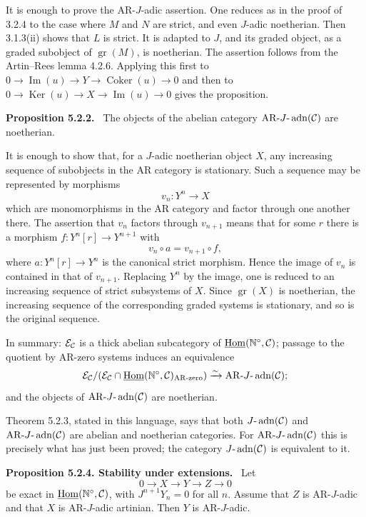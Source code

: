 \documentclass[11pt]{article}
\theoremstyle{plain}
\theoremstyle{definition}
\theoremstyle{remark}
\newenvironment{statement}[1]{\par\medskip\noindent\textbf{#1.}\ }{\par\medskip}
\newcommand{\bN}{\mathbb N}
\DeclareMathOperator{\Hom}{Hom}
\DeclareMathOperator{\Ker}{Ker}
\DeclareMathOperator{\Coker}{Coker}
\DeclareMathOperator{\Imn}{Im}
\DeclareMathOperator{\gr}{gr}
\newcommand{\AR}{\mathrm{AR}}
\providecommand{\adn}{\operatorname{adn}}
\begin{document}
It is enough to prove the AR-$J$-adic assertion. One reduces as in the proof of
3.2.4 to the case where $M$ and $N$ are strict, and even $J$-adic noetherian. Then
3.1.3(ii) shows that $L$ is strict. It is adapted to $J$, and its graded object, as
a graded subobject of $\gr(M)$, is noetherian. The assertion follows from the
Artin--Rees lemma 4.2.6. Applying this first to
$0\to\Imn(u)\to Y\to\Coker(u)\to0$ and then to
$0\to\Ker(u)\to X\to\Imn(u)\to0$ gives the proposition.

\begin{statement}{Proposition 5.2.2}
The objects of the abelian category $\AR\text{-}J\text{-}\adn(\cC)$ are noetherian.
\end{statement}

It is enough to show that, for a $J$-adic noetherian object $X$, any increasing
sequence of subobjects in the AR category is stationary. Such a sequence may be
represented by morphisms
\[
      v_n:Y^n\longrightarrow X
\]
which are monomorphisms in the AR category and factor through one another there.
The assertion that $v_n$ factors through $v_{n+1}$ means that for some $r$ there is
a morphism $f:Y^n[r]\to Y^{n+1}$ with
\[
      v_n\circ a=v_{n+1}\circ f,
\]
where $a:Y^n[r]\to Y^n$ is the canonical strict morphism. Hence the image of
$v_n$ is contained in that of $v_{n+1}$. Replacing $Y^n$ by the image, one is
reduced to an increasing sequence of strict subsystems of $X$. Since $\gr(X)$ is
noetherian, the increasing sequence of the corresponding graded systems is
stationary, and so is the original sequence.

In summary: $\mathcal E_\mathcal C$ is a thick abelian subcategory of
$\underline{\Hom}(\bN^\circ,\cC)$; passage to the quotient by AR-zero systems
induces an equivalence
\[
\cE_\cC/(\cE_\cC\cap\underline{\Hom}(\bN^\circ,\cC)_{\AR\text{-zero}})
\xrightarrow{\sim}
\AR\text{-}J\text{-}\adn(\cC);
\]
and the objects of $\AR\text{-}J\text{-}\adn(\cC)$ are noetherian.

Theorem 5.2.3, stated in this language, says that both
$J\text{-}\adn(\cC)$ and $\AR\text{-}J\text{-}\adn(\cC)$ are abelian and noetherian
categories. For $\AR\text{-}J\text{-}\adn(\cC)$ this is precisely what has just been
proved; the category $J\text{-}\adn(\cC)$ is equivalent to it.

\begin{statement}{Proposition 5.2.4. Stability under extensions}
Let
\[
       0\to X\to Y\to Z\to0
\]
be exact in $\underline{\Hom}(\bN^\circ,\cC)$, with $J^{n+1}Y_n=0$ for all $n$.
Assume that $Z$ is AR-$J$-adic and that $X$ is AR-$J$-adic artinian. Then $Y$ is
AR-$J$-adic.
\end{statement}
\end{document}
